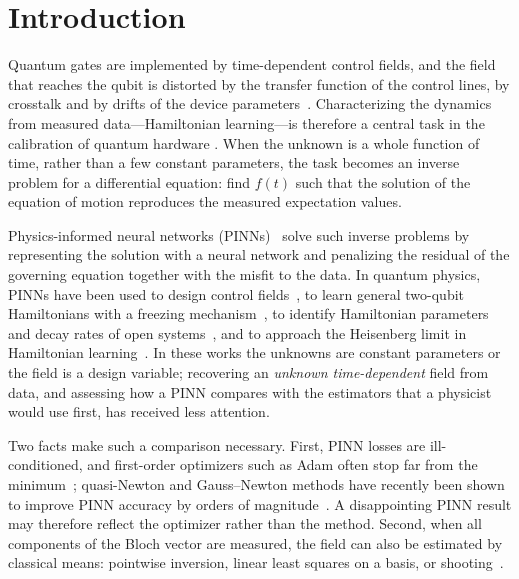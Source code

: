\documentclass[aps,pra,twocolumn,superscriptaddress,10pt,longbibliography,floatfix]{revtex4-2}
\begin{document}
\section{Introduction}\label{sec:intro}

Quantum gates are implemented by time-dependent control fields, and the field that reaches the qubit
is distorted by the transfer function of the control lines, by crosstalk and by drifts of the device
parameters~\cite{gustavsson2013distortion}. Characterizing the dynamics from measured data---Hamiltonian
learning---is therefore a central task in the calibration of quantum hardware
\cite{zhang2014identification,wiebe2014learning}. When the unknown is a whole function of time, rather
than a few constant parameters, the task becomes an inverse problem for a differential equation: find
$f(t)$ such that the solution of the equation of motion reproduces the measured expectation values.

Physics-informed neural networks (PINNs)~\cite{raissi2019pinn,karniadakis2021piml} solve such inverse
problems by representing the solution with a neural network and penalizing the residual of the
governing equation together with the misfit to the data. In quantum physics, PINNs have been used to
design control fields~\cite{norambuena2024pinnqc}, to learn general two-qubit Hamiltonians with a
freezing mechanism~\cite{castelano2024freezing}, to identify Hamiltonian parameters and decay rates of
open systems~\cite{delima2025pinnverse}, and to approach the Heisenberg limit in Hamiltonian
learning~\cite{liu2025ipinnhl}. In these works the unknowns are constant parameters or the field is a
design variable; recovering an \emph{unknown time-dependent} field from data, and assessing how a PINN
compares with the estimators that a physicist would use first, has received less attention.

Two facts make such a comparison necessary. First, PINN losses are ill-conditioned, and first-order
optimizers such as Adam often stop far from the minimum~\cite{krishnapriyan2021failure,rathore2024challenges};
quasi-Newton and Gauss--Newton methods have recently been shown to improve PINN accuracy by orders of
magnitude~\cite{urban2025unveiling,kiyani2025optimizer,muller2023engd,jnini2024gnngd,jnini2025dual}.
A disappointing PINN result may therefore reflect the optimizer rather than the method. Second, when
all components of the Bloch vector are measured, the field can also be estimated by classical means:
pointwise inversion, linear least squares on a basis, or shooting~\cite{hansen2010discrete}.
\end{document}
